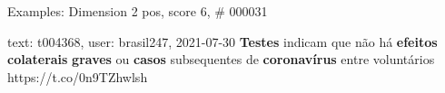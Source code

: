 \begin{frame}{Examples: Dimension 2 pos, score 6, \# 000031}
\footnotesize
\begin{exampleblock}{text: t004368, user: brasil247, 2021-07-30}
\textbf{Testes} indicam que não há \textbf{efeitos} \textbf{colaterais} 
\textbf{graves} ou \textbf{casos} subsequentes de \textbf{coronavírus} entre 
voluntários https://t.co/0n9TZhwlsh 
\end{exampleblock}
\end{frame}
